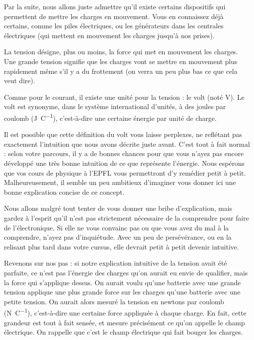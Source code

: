 \documentclass{article}
\begin{document}
Par la suite, nous allons juste admettre qu'il existe certains dispositifs qui permettent de mettre les charges en mouvement. Vous en connaissez déjà certains, comme les piles électriques, ou les générateurs dans les centrales électriques (qui mettent en mouvement les charges jusqu'à nos prises).

La tension désigne, plus ou moins, la force qui met en mouvement les charges. Une grande tension signifie que les charges vont se mettre en mouvement plus rapidement même s'il y a du \og frottement \fg (on verra un peu plus bas ce que cela veut dire). 

Comme pour le courant, il existe une unité pour la tension : le volt (noté \si{\volt}). Le volt est synonyme, dans le système international d'unités, à des joules par coulomb (\si{\joule\per\coulomb}), c'est-à-dire une certaine énergie par unité de charge.

Il est possible que cette définition du volt vous laisse perplexes, ne reflétant pas exactement l'intuition que nous avons décrite juste avant. C'est tout à fait normal : selon votre parcours, il y a de bonnes chances pour que vous n'ayez pas encore développé une très bonne intuition de ce que représente l'énergie. Nous espérons que vos cours de physique à l'EPFL vous permettront d'y remédier petit à petit. Malheureusement, il semble un peu ambitieux d'imaginer vous donner ici une bonne explication concise de ce concept.

Nous allons malgré tout tenter de vous donner une bribe d'explication, mais gardez à l'esprit qu'il n'est pas strictement nécessaire de la comprendre pour faire de l'électronique. Si elle ne vous convainc pas ou que vous avez du mal à la comprendre, n'ayez pas d'inquiétude. Avec un peu de persévérance, ou en la relisant plus tard dans votre cursus, elle devrait petit à petit devenir intuitive.

Revenons sur nos pas : si notre explication intuitive de la tension avait été parfaite, ce n'est pas l'énergie des charges qu'on aurait eu envie de qualifier, mais la force qui s'applique dessus. On aurait voulu qu'une batterie avec une grande tension applique une plus grande force sur les charges qu'une batterie avec une petite tension. On aurait alors mesuré la tension en newtons par coulomb (\si{\newton\per\coulomb}), c'est-à-dire une certaine force appliquée à chaque charge. En fait, cette grandeur est tout à fait sensée, et mesure précisément ce qu'on appelle le champ électrique. On rappelle que c'est le champ électrique qui fait bouger les charges.
\end{document}
